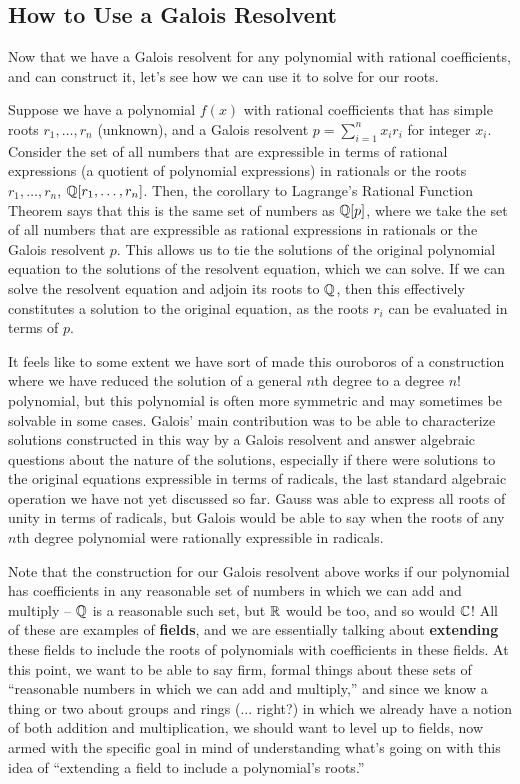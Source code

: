 \documentclass[12pt]{scrartcl}
\begin{document}
\subsection{How to Use a Galois Resolvent}
Now that we have a Galois resolvent for any polynomial with rational coefficients, and can construct it, let's see how we can use it to solve for our roots. 

Suppose we have a polynomial $f(x)$ with rational coefficients that has simple roots $r_1, \dots, r_n$ (unknown), and a Galois resolvent $p = \sum_{i=1}^n x_i r_i$ for integer $x_i$. Consider the set of all numbers that are expressible in terms of rational expressions (a quotient of polynomial expressions) in rationals or the roots $r_1, \dots, r_n$, $\mathbb Q[r_1, \dots, r_n]$. Then, the corollary to Lagrange's Rational Function Theorem says that this is the same set of numbers as $\mathbb Q[p]$, where we take the set of all numbers that are expressible as rational expressions in rationals or the Galois resolvent $p$. This allows us to tie the solutions of the original polynomial equation to the solutions of the resolvent equation, which we can solve. If we can solve the resolvent equation and adjoin its roots to $\mathbb Q$, then this effectively constitutes a solution to the original equation, as the roots $r_i$ can be evaluated in terms of $p$. 

It feels like to some extent we have sort of made this ouroboros of a construction where we have reduced the solution of a general $n$th degree to a degree $n!$ polynomial, but this polynomial is often more symmetric and may sometimes be solvable in some cases. Galois' main contribution was to be able to characterize solutions constructed in this way by a Galois resolvent and answer algebraic questions about the nature of the solutions, especially if there were solutions to the original equations expressible in terms of radicals, the last standard algebraic operation we have not yet discussed so far. Gauss was able to express all roots of unity in terms of radicals, but Galois would be able to say when the roots of any $n$th degree polynomial were rationally expressible in radicals. 

Note that the construction for our Galois resolvent above works if our polynomial has coefficients in any reasonable set of numbers in which we can add and multiply -- $\mathbb Q$ is a reasonable such set, but $\mathbb R$ would be too, and so would $\mathbb C$! All of these are examples of \textbf{fields}, and we are essentially talking about \textbf{extending} these fields to include the roots of polynomials with coefficients in these fields. At this point, we want to be able to say firm, formal things about these sets of ``reasonable numbers in which we can add and multiply,'' and since we know a thing or two about groups and rings (... right?) in which we already have a notion of both addition and multiplication, we should want to level up to fields, now armed with the specific goal in mind of understanding what's going on with this idea of ``extending a field to include a polynomial's roots.'' 
\end{document}
